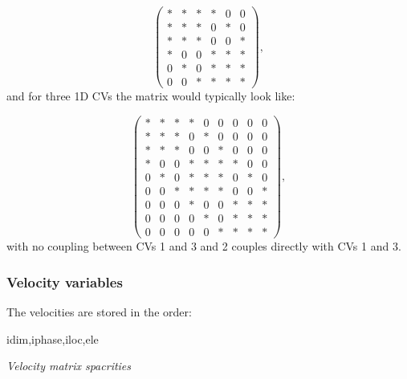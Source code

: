 \begin{equation}
  \begin{pmatrix}
*  &  *  &  *      &   *   &  0  &  0  \\
*  &  *  &  *      &   0   &  *  &  0  \\
*  &  *  &  *      &   0   &  0  &  *  \\
%
*  &  0  &  0      &   *   &  *  &  *  \\
0  &  *  &  0      &   *   &  *  &  *  \\
0  &  0  &  *      &   *   &  *  &  *
  \end{pmatrix},
\label{optimal-CV-mat-spar}
\end{equation}
and for three 1D CVs the matrix would typically look like:

\begin{equation}
  \begin{pmatrix}
*  &  *  &  *      &   *   &  0  &  0    &   0   &  0  &  0   \\
*  &  *  &  *      &   0   &  *  &  0    &   0   &  0  &  0  \\
*  &  *  &  *      &   0   &  0  &  *    &   0   &  0  &  0  \\
%
*  &  0  &  0      &   *   &  *  &  *    &   *   &  0  &  0  \\
0  &  *  &  0      &   *   &  *  &  *    &   0   &  *  &  0  \\
0  &  0  &  *      &   *   &  *  &  *    &   0   &  0  &  *  \\
%
0  &  0  &  0      &   *   &  0  &  0    &   *   &  *  &  *  \\
0  &  0  &  0      &   0   &  *  &  0    &   *   &  *  &  *  \\
0  &  0  &  0      &   0   &  0  &  *    &   *   &  *  &  *
  \end{pmatrix},
\label{optimal-CV-mat-spar-3CV}
\end{equation}
with no coupling between CVs 1 and 3 and 2 couples directly with CVs
1 and 3.



\subsubsection{Velocity variables}
The velocities are stored in the order:
\par\noindent
idim,iphase,iloc,ele


\par\noindent
{\it Velocity matrix spacrities}

